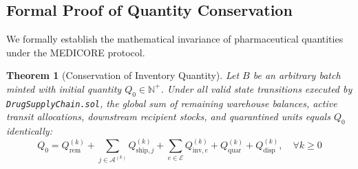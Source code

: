 \documentclass[pdflatex,sn-mathphys-num]{sn-jnl}
\theoremstyle{thmstyleone}
\newtheorem{theorem}{Theorem}
\theoremstyle{thmstyletwo}
\theoremstyle{thmstylethree}
\begin{document}
\subsection{Formal Proof of Quantity Conservation}

We formally establish the mathematical invariance of pharmaceutical quantities under the MEDICORE protocol.

\begin{theorem}[Conservation of Inventory Quantity]\label{thm:conservation}
Let $B$ be an arbitrary batch minted with initial quantity $Q_0 \in \mathbb{N}^+$. Under all valid state transitions executed by \texttt{DrugSupplyChain.sol}, the global sum of remaining warehouse balances, active transit allocations, downstream recipient stocks, and quarantined units equals $Q_0$ identically:
\begin{equation}
Q_0 = Q_{\text{rem}}^{(k)} + \sum_{j \in \mathcal{A}^{(k)}} Q_{\text{ship}, j}^{(k)} + \sum_{e \in \mathcal{E}} Q_{\text{inv}, e}^{(k)} + Q_{\text{quar}}^{(k)} + Q_{\text{disp}}^{(k)}, \quad \forall k \ge 0
\end{equation}
\end{theorem}
\end{document}
